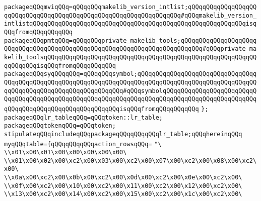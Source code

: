 \verb|packageqQQqmviqQQq=qQQqqQQqmakelib_version_intlist;qQQqqQQqqQQqqQQqqQQqqQQqqQQqqQQqqQQqqQQqqQQqqQQqqQQqqQQqqQQqqQQqqQQq#qQQqmakelib_version_intlistqQQqqQQqqQQqqQQqqQQqqQQqqQQqqQQqqQQqqQQqqQQqqQQqqQQqqQQqqQQqisqQQqfromqQQqqQQqqQQq|\newline
\verb|packageqQQqpmtqQQq=qQQqqQQqprivate_makelib_tools;qQQqqQQqqQQqqQQqqQQqqQQqqQQqqQQqqQQqqQQqqQQqqQQqqQQqqQQqqQQqqQQqqQQqqQQqqQQq#qQQqprivate_makelib_toolsqQQqqQQqqQQqqQQqqQQqqQQqqQQqqQQqqQQqqQQqqQQqqQQqqQQqqQQqqQQqqQQqqQQqisqQQqfromqQQqqQQqqQQq|\newline
\verb|packageqQQqsyqQQqqQQq=qQQqqQQqsymbol;qQQqqQQqqQQqqQQqqQQqqQQqqQQqqQQqqQQqqQQqqQQqqQQqqQQqqQQqqQQqqQQqqQQqqQQqqQQqqQQqqQQqqQQqqQQqqQQqqQQqqQQqqQQqqQQqqQQqqQQqqQQqqQQqqQQqqQQq#qQQqsymbolqQQqqQQqqQQqqQQqqQQqqQQqqQQqqQQqqQQqqQQqqQQqqQQqqQQqqQQqqQQqqQQqqQQqqQQqqQQqqQQqqQQqqQQqqQQqqQQqqQQqqQQqqQQqqQQqqQQqqQQqqQQqqQQqisqQQqfromqQQqqQQqqQQq|\newline
\newline
\newline
\verb|};|\newline
\verb|packageqQQqlr_tableqQQq=qQQqtoken::lr_table;|\newline
\verb|packageqQQqtokenqQQq=qQQqtoken;|\newline
\verb|stipulateqQQqincludeqQQqpackageqQQqqQQqqQQqlr_table;qQQqhereinqQQq|\newline
\verb|myqQQqtable={qQQqqQQqqQQqaction_rowsqQQq=|\newline
\verb|"\|\newline
\verb|\\x01\x00\x01\x00\x00\x00\x00\x00\|\newline
\verb|\\x01\x00\x02\x00\xc2\x00\x03\x00\xc2\x00\x07\x00\xc2\x00\x08\x00\xc2\x00\|\newline
\verb|\\x0a\x00\xc2\x00\x0b\x00\xc2\x00\x0d\x00\xc2\x00\x0e\x00\xc2\x00\|\newline
\verb|\\x0f\x00\xc2\x00\x10\x00\xc2\x00\x11\x00\xc2\x00\x12\x00\xc2\x00\|\newline
\verb|\\x13\x00\xc2\x00\x14\x00\xc2\x00\x15\x00\xc2\x00\x1c\x00\xc2\x00\|\newline
